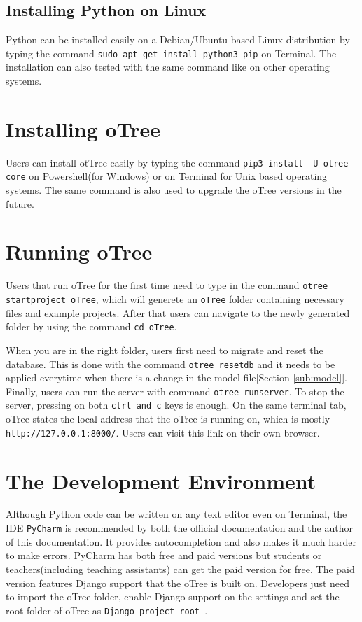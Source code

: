 \begin{appendix}
\subsection{Installing Python on Linux}

Python can be installed easily on a Debian/Ubuntu based Linux distribution by typing the command \verb|sudo apt-get install python3-pip| on Terminal. The installation can also tested with the same command like on other operating systems.

\section{Installing oTree}

Users can install otTree easily by typing the command \verb|pip3 install -U otree-core| on Powershell(for Windows) or on Terminal for Unix based operating systems. The same command is also used to upgrade the oTree versions in the future.

\section{Running oTree}

Users that run oTree for the first time need to type in the command \verb|otree startproject oTree|, which will generete an \verb|oTree| folder containing necessary files and example projects. After that users can navigate to the newly generated folder by using the command \verb|cd oTree|. 

When you are in the right folder, users first need to migrate and reset the database. This is done with the command \verb|otree resetdb| and it needs to be applied everytime when there is a change in the model file[Section \ref{sub:model}]. Finally, users can run the server with command \verb|otree runserver|. To stop the server, pressing on both \verb|ctrl and c| keys is enough. On the same terminal tab, oTree states the local address that the oTree is running on, which is mostly \verb|http://127.0.0.1:8000/|. Users can visit this link on their own browser.

\section{The Development Environment}

Although Python code can be written on any text editor even on Terminal, the IDE \verb|PyCharm| is recommended by both the official documentation and the author of this documentation. It provides autocompletion and also makes it much harder to make errors. PyCharm has both free and paid versions but students or teachers(including teaching assistants) can get the paid version for free. The paid version features Django support that the oTree is built on. Developers just need to import the oTree folder, enable Django support on the settings and set the root folder of oTree as \verb|Django project root |. 


\end{appendix}
